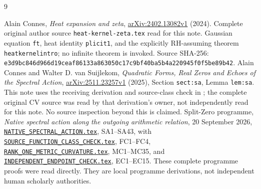 \documentclass[11pt]{article}
\begin{document}
\begin{thebibliography}{9}\raggedright
{}
Alain Connes, \emph{Heat expansion and zeta},
\href{https://arxiv.org/abs/2402.13082v1}{arXiv:2402.13082v1}
(2024). Complete original author source
\texttt{heat-kernel-zeta.tex} read for this note.
Gaussian equation \texttt{ft}, heat identity \texttt{plicit1},
and the explicitly RH-assuming theorem
\texttt{heatkernelintro}; no infinite theorem is invoked.
Source SHA-256:
\texttt{e3d9bc846d966d19ceaf86133a863050c17c9bf40ba5b4a220945f0f5be89b42}.
Alain Connes and Walter D. van Suijlekom,
\emph{Quadratic Forms, Real Zeros and Echoes of the Spectral Action},
\href{https://arxiv.org/abs/2511.23257v1}{arXiv:2511.23257v1}
(2025), Section \texttt{sect:sa}, Lemma \texttt{lem:sa}.
This note uses the receiving derivation and source-class
check in \cite{NativeAction}; the complete original CV
source was read by that derivation's owner, not independently
read for this note. No source inspection beyond this is claimed.
Split-Zero programme, \emph{Native spectral action along the
outgoing arithmetic relation}, 20 September 2026,
\href{https://github.com/KokunoYumeto/zeta-function-research-reader/blob/5992ad50c0f2a06921f1fcaded7b4e38097c0739/workbenches/splitzero-tandem/continuations/20260920-original-kernel-mixed-determinants/providers/NATIVE_SPECTRAL_ACTION.tex\#L1}{\texttt{NATIVE\_SPECTRAL\_ACTION.tex}}, SA1--SA43, with
\href{https://github.com/KokunoYumeto/zeta-function-research-reader/blob/5992ad50c0f2a06921f1fcaded7b4e38097c0739/workbenches/splitzero-tandem/continuations/20260920-original-kernel-mixed-determinants/providers/SOURCE_FUNCTION_CLASS_CHECK.tex\#L1}{\texttt{SOURCE\_FUNCTION\_CLASS\_CHECK.tex}}, FC1--FC4,
\href{https://github.com/KokunoYumeto/zeta-function-research-reader/blob/5992ad50c0f2a06921f1fcaded7b4e38097c0739/workbenches/splitzero-tandem/continuations/20260920-original-kernel-mixed-determinants/providers/RANK_ONE_METRIC_CURVATURE.tex\#L1}{\texttt{RANK\_ONE\_METRIC\_CURVATURE.tex}}, MC1--MC35, and
\href{https://github.com/KokunoYumeto/zeta-function-research-reader/blob/5992ad50c0f2a06921f1fcaded7b4e38097c0739/workbenches/splitzero-tandem/continuations/20260920-original-kernel-mixed-determinants/providers/INDEPENDENT_ENDPOINT_CHECK.tex\#L1}{\texttt{INDEPENDENT\_ENDPOINT\_CHECK.tex}}, EC1--EC15.
These complete programme proofs were read directly.
They are local programme derivations, not independent
human scholarly authorities.


\end{thebibliography}
\end{document}
